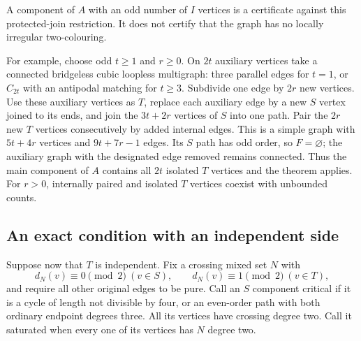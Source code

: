 A component of $A$ with an odd number of $I$ vertices is a certificate
against this protected-join restriction. It does not certify that the
graph has no locally irregular two-colouring.

For example, choose odd $t\ge1$ and $r\ge0$. On $2t$ auxiliary vertices
take a connected bridgeless cubic loopless multigraph: three parallel
edges for $t=1$, or $C_{2t}$ with an antipodal matching for $t\ge3$.
Subdivide one edge by $2r$ new vertices. Use these auxiliary vertices as
$T$, replace each auxiliary edge by a new $S$ vertex joined to its ends,
and join the $3t+2r$ vertices of $S$ into one path. Pair the $2r$ new
$T$ vertices consecutively by added internal edges. This is a simple
graph with $5t+4r$ vertices and $9t+7r-1$ edges. Its $S$ path has odd
order, so $F=\varnothing$; the auxiliary graph with the designated edge
removed remains connected. Thus the main component of $A$ contains all
$2t$ isolated $T$ vertices and the theorem applies. For $r>0$, internally
paired and isolated $T$ vertices coexist with unbounded counts.

\subsection{An exact condition with an independent side}

Suppose now that $T$ is independent. Fix a crossing mixed set $N$ with
\begin{equation}\label{eq:fixedjoinparity}
 d_N(v)\equiv0\pmod2\ (v\in S),\qquad
 d_N(v)\equiv1\pmod2\ (v\in T),
\end{equation}
and require all other original edges to be pure. Call an $S$ component
critical if it is a cycle of length not divisible by four, or an
even-order path with both ordinary endpoint degrees three. All its
vertices have crossing degree two. Call it saturated when every one
of its vertices has $N$ degree two.

